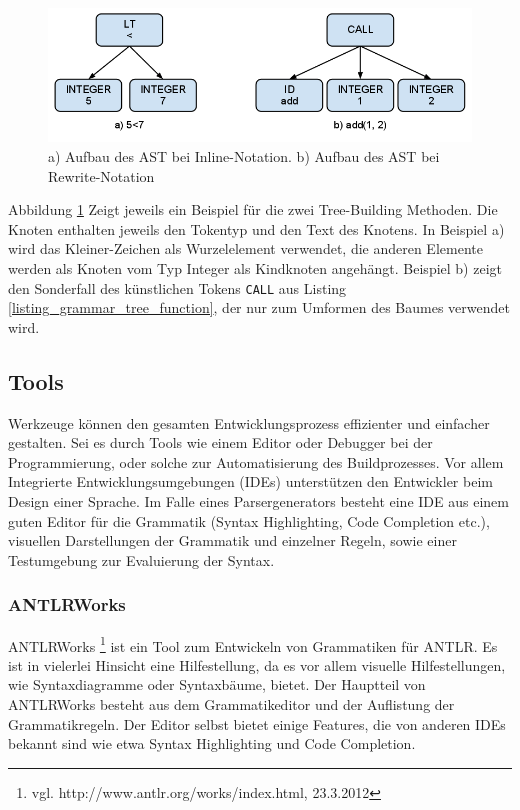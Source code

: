 \begin{figure}[h]
\includegraphics[scale=0.5]{figures/ast_beispiele}
\caption{a) Aufbau des AST bei Inline-Notation. b) Aufbau des AST bei Rewrite-Notation}
\label{abb_ast_beispiele}
\end{figure}

Abbildung \ref{abb_ast_beispiele} Zeigt jeweils ein Beispiel für die zwei Tree-Building Methoden. Die Knoten enthalten jeweils den Tokentyp und den Text des Knotens. In Beispiel a) wird das Kleiner-Zeichen als Wurzelelement verwendet, die anderen Elemente werden als Knoten vom Typ Integer als Kindknoten an\-ge\-hängt. Beispiel b) zeigt den Sonderfall des künstlichen Tokens \texttt{CALL} aus Listing \ref{listing_grammar_tree_function}, der nur zum Umformen des Baumes verwendet wird.


\subsection{Tools}
\label{tools_antlr_tools}

Werkzeuge können den gesamten Entwicklungsprozess effizienter und einfacher gestalten. Sei es durch Tools wie einem Editor oder Debugger bei der Programmierung, oder solche zur Automatisierung des Buildprozesses. Vor allem Integrierte Entwicklungsumgebungen (IDEs) unterstützen den Entwickler beim Design einer Sprache. Im Falle eines Parsergenerators besteht eine IDE aus einem guten Editor für die Grammatik (Syntax Highlighting, Code Completion etc.), visuellen Darstellungen der Grammatik und einzelner Regeln, sowie einer Testumgebung zur Eva\-lu\-ier\-ung der Syntax.

\subsubsection{ANTLRWorks}

ANTLRWorks \footnote{vgl. http://www.antlr.org/works/index.html, 23.3.2012} ist ein Tool zum Entwickeln von Grammatiken für ANTLR. Es ist in vielerlei Hinsicht eine Hilfestellung, da es vor allem visuelle Hilfestellungen, wie Syntaxdiagramme oder Syntaxbäume, bietet. Der Hauptteil von ANTLRWorks besteht aus dem Grammatikeditor und der Auflistung der Grammatikregeln. Der Editor selbst bietet einige Features, die von anderen IDEs bekannt sind wie etwa Syntax Highlighting und Code Completion.

